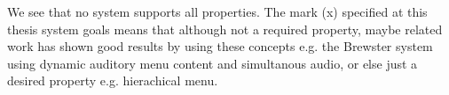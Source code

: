 We see that no system supports all properties. The mark (x) specified at this thesis system goals means that although not a required property, maybe related work has shown good results by using these concepts e.g. the Brewster \cite{brewster_multimodaleyes-freeinteraction_2003} system using dynamic auditory menu content and simultanous audio, or else just a desired property e.g. hierachical menu.












